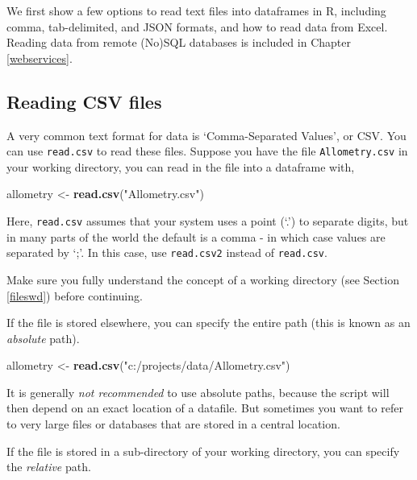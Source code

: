 \documentclass[]{book}
\newenvironment{Shaded}{\begin{snugshade}}{\end{snugshade}}
\newcommand{\KeywordTok}[1]{\textcolor[rgb]{0.13,0.29,0.53}{\textbf{#1}}}
\newcommand{\NormalTok}[1]{#1}
\newcommand{\StringTok}[1]{\textcolor[rgb]{0.31,0.60,0.02}{#1}}
\begin{document}
We first show a few options to read text files into dataframes in R, including comma, tab-delimited, and JSON formats, and how to read data from Excel. Reading data from remote (No)SQL databases is included in Chapter \ref{webservices}.

\hypertarget{readcsv}{%
\subsection{Reading CSV files}\label{readcsv}}

A very common text format for data is `Comma-Separated Values', or CSV. You can use \texttt{read.csv} to read these files. Suppose you have the file \texttt{Allometry.csv} in your working directory, you can read in the file into a dataframe with,

\begin{Shaded}
\begin{Highlighting}[]
\NormalTok{allometry <-}\StringTok{ }\KeywordTok{read.csv}\NormalTok{(}\StringTok{"Allometry.csv"}\NormalTok{)}
\end{Highlighting}
\end{Shaded}

Here, \texttt{read.csv} assumes that your system uses a point (`.') to separate digits, but in many parts of the world the default is a comma - in which case values are separated by `;'. In this case, use \texttt{read.csv2} instead of \texttt{read.csv}.

Make sure you fully understand the concept of a working directory (see Section \ref{fileswd}) before continuing.

If the file is stored elsewhere, you can specify the entire path (this is known as an \emph{absolute} path).

\begin{Shaded}
\begin{Highlighting}[]
\NormalTok{allometry <-}\StringTok{ }\KeywordTok{read.csv}\NormalTok{(}\StringTok{"c:/projects/data/Allometry.csv"}\NormalTok{)}
\end{Highlighting}
\end{Shaded}

It is generally \emph{not recommended} to use absolute paths, because the script will then depend on an exact location of a datafile. But sometimes you want to refer to very large files or databases that are stored in a central location.

If the file is stored in a sub-directory of your working directory, you can specify the \emph{relative} path.
\end{document}
